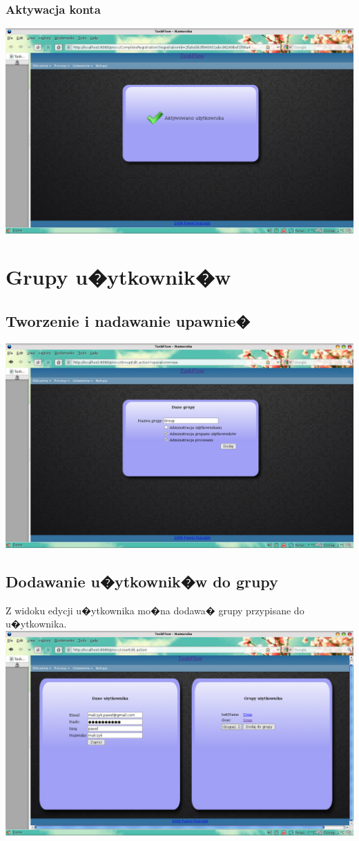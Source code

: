 \documentclass{article}
\begin{document}
\subsubsection{Aktywacja konta}
\includegraphics[scale=0.4]{img/reg3.png}


\section{Grupy u�ytkownik�w}
\subsection{Tworzenie i nadawanie upawnie�}
\includegraphics[scale=0.4]{img/grp1.png}
\subsection{Dodawanie u�ytkownik�w do grupy}
Z widoku edycji u�ytkownika mo�na dodawa� grupy przypisane do u�ytkownika.
\includegraphics[scale=0.4]{img/grp2.png}
\end{document}
